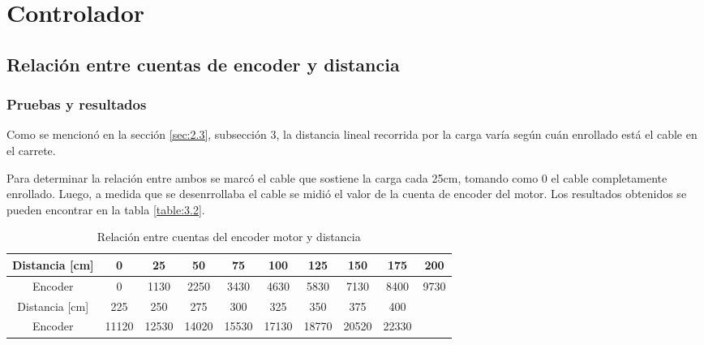 

\section{Controlador} \label{sec:\thesection}

\subsection{Relación entre cuentas de encoder y distancia}
\subsubsection{Pruebas y resultados}
Como se mencionó en la sección \ref{sec:2.3}, subsección 3, la distancia lineal recorrida por la carga varía según cuán enrollado está el cable en el carrete. 

Para determinar la relación entre ambos se marcó el cable que sostiene la carga cada 25cm, tomando como 0 el cable completamente enrollado. Luego, a medida que se desenrrollaba el cable se midió el valor de la cuenta de encoder del motor. Los resultados obtenidos se pueden encontrar en la tabla \ref{table:3.2}.

\begin{table}[!ht]
	\begin{center}
		\begin{tabular}{|c|c|c|c|c|c|c|c|c|c|}
			\hline
			Distancia [cm] & 0 & 25 & 50 & 75 & 100 & 125 & 150 & 175 & 200  \\
			\hline
			Encoder & 0 & 1130 & 2250 & 3430 & 4630 & 5830 & 7130 & 8400 & 9730 \\
			\hline \hline
			Distancia [cm]  & 225 & 250 & 275 & 300 & 325 & 350 & 375 & 400 & \\
			\hline
			Encoder  & 11120 & 12530 & 14020 & 15530 & 17130 & 18770 & 20520 & 22330 & \\ 
			\hline
		\end{tabular}
	\end{center}
	\caption{Relación entre cuentas del encoder motor y distancia}
	\label{table:\thetable}
\end{table}

